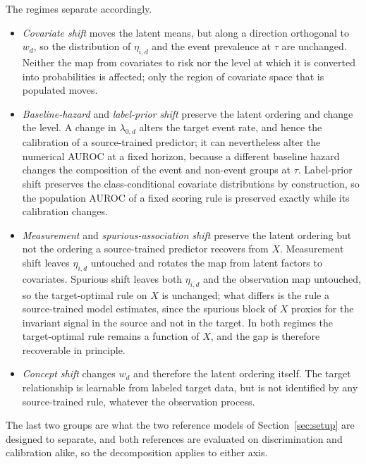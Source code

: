 The regimes separate accordingly.
\begin{itemize}
\item \emph{Covariate shift} moves the latent means, but along a direction
orthogonal to $w_d$, so the distribution of $\eta_{i,d}$ and the event
prevalence at $\tau$ are unchanged. Neither the map from covariates to risk nor
the level at which it is converted into probabilities is affected; only the
region of covariate space that is populated moves.

\item \emph{Baseline-hazard} and \emph{label-prior shift} preserve the latent
ordering and change the level. A change in $\lambda_{0,d}$ alters the target
event rate, and hence the calibration of a source-trained predictor; it can
nevertheless alter the numerical AUROC at a fixed horizon, because a different
baseline hazard changes the composition of the event and non-event groups at
$\tau$. Label-prior shift preserves the class-conditional covariate
distributions by construction, so the population AUROC of a fixed scoring rule
is preserved exactly while its calibration changes.

\item \emph{Measurement} and \emph{spurious-association shift} preserve the
latent ordering but not the ordering a source-trained predictor recovers from
$X$. Measurement shift leaves $\eta_{i,d}$ untouched and rotates the map from
latent factors to covariates. Spurious shift leaves both $\eta_{i,d}$ and the
observation map untouched, so the target-optimal rule on $X$ is unchanged; what
differs is the rule a source-trained model estimates, since the spurious block
of $X$ proxies for the invariant signal in the source and not in the target. In
both regimes the target-optimal rule remains a function of $X$, and the gap is
therefore recoverable in principle.

\item \emph{Concept shift} changes $w_d$ and therefore the latent ordering
itself. The target relationship is learnable from labeled target data, but is
not identified by any source-trained rule, whatever the observation process.
\end{itemize}
The last two groups are what the two reference models of
Section~\ref{sec:setup} are designed to separate, and both references are
evaluated on discrimination and calibration alike, so the decomposition applies
to either axis.
